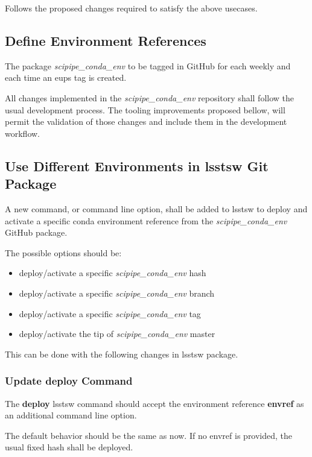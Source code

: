 Follows the proposed changes required to satisfy the above usecases.

\subsection{Define Environment References} \label{sec:envDefine}

The package \textit{scipipe\_conda\_env} to be tagged in GitHub for each weekly and each time an eups tag is created.

All changes implemented in the \textit{scipipe\_conda\_env} repository shall follow the usual development process.  
The tooling improvements proposed bellow, will permit the validation of those changes and include them in the development workflow.


\subsection{Use Different Environments in lsstsw Git Package} \label{sec:envActivate}

A new command, or command line option, shall be added to lsstsw to deploy and activate a specific conda environment reference from the \textit{scipipe\_conda\_env} GitHub package.

The possible options should be:

\begin{itemize}
\item deploy/activate a specific \textit{scipipe\_conda\_env} hash
\item deploy/activate a specific \textit{scipipe\_conda\_env} branch
\item deploy/activate a specific \textit{scipipe\_conda\_env} tag
\item deploy/activate the tip of \textit{scipipe\_conda\_env} master
\end{itemize}

This can be done with the following changes in lsstsw package.

\subsubsection{Update deploy Command} \label{sec:deploy}

The \textbf{deploy} lsstsw command should accept the environment reference \textbf{envref}  as an additional command line option.

The default behavior should be the same as now. If no envref is provided, the usual fixed hash shall be deployed. 

